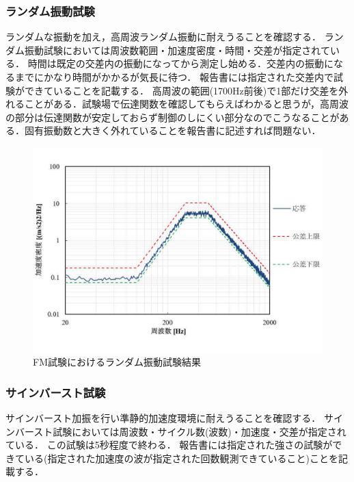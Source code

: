 \subsubsection{ランダム振動試験}
ランダムな振動を加え，高周波ランダム振動に耐えうることを確認する．
ランダム振動試験においては周波数範囲・加速度密度・時間・交差が指定されている．
時間は既定の交差内の振動になってから測定し始める．交差内の振動になるまでにかなり時間がかかるが気長に待つ．
報告書には指定された交差内で試験ができていることを記載する．
高周波の範囲(1700Hz前後)で1部だけ交差を外れることがある．試験場で伝達関数を確認してもらえばわかると思うが，高周波の部分は伝達関数が安定しておらず制御のしにくい部分なのでこうなることがある．固有振動数と大きく外れていることを報告書に記述すれば問題ない．

\begin{figure}[H]
	\centering
	\includegraphics[width=1\linewidth]{04/fig/4-3-5.pdf}
	\caption{FM試験におけるランダム振動試験結果\cite{FM_vibration_test_report}}
	\label{fig4-3-1}
\end{figure}

\subsubsection{サインバースト試験}
サインバースト加振を行い準静的加速度環境に耐えうることを確認する．
サインバースト試験においては周波数・サイクル数(波数)・加速度・交差が指定されている．
この試験は5秒程度で終わる．
報告書には指定された強さの試験ができている(指定された加速度の波が指定された回数観測できていること)ことを記載する．



